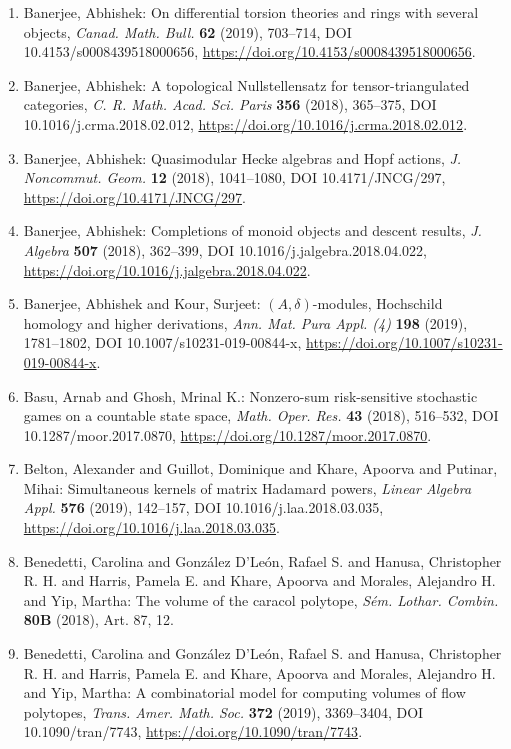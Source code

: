 \begin{enumerate}
\item Banerjee, Abhishek: On differential torsion theories and rings with several
objects, \emph{Canad. Math. Bull.} {\bf 62} (2019), 703--714, DOI 10.4153/s0008439518000656, \url{https://doi.org/10.4153/s0008439518000656}.
\item Banerjee, Abhishek: A topological {N}ullstellensatz for tensor-triangulated
categories, \emph{C. R. Math. Acad. Sci. Paris} {\bf 356} (2018), 365--375, DOI 10.1016/j.crma.2018.02.012, \url{https://doi.org/10.1016/j.crma.2018.02.012}.
\item Banerjee, Abhishek: Quasimodular {H}ecke algebras and {H}opf actions, \emph{J. Noncommut. Geom.} {\bf 12} (2018), 1041--1080, DOI 10.4171/JNCG/297, \url{https://doi.org/10.4171/JNCG/297}.
\item Banerjee, Abhishek: Completions of monoid objects and descent results, \emph{J. Algebra} {\bf 507} (2018), 362--399, DOI 10.1016/j.jalgebra.2018.04.022, \url{https://doi.org/10.1016/j.jalgebra.2018.04.022}.
\item Banerjee, Abhishek and Kour, Surjeet: {$(A,\delta)$}-modules, {H}ochschild homology and higher
derivations, \emph{Ann. Mat. Pura Appl. (4)} {\bf 198} (2019), 1781--1802, DOI 10.1007/s10231-019-00844-x, \url{https://doi.org/10.1007/s10231-019-00844-x}.
\item Basu, Arnab and Ghosh, Mrinal K.: Nonzero-sum risk-sensitive stochastic games on a countable
state space, \emph{Math. Oper. Res.} {\bf 43} (2018), 516--532, DOI 10.1287/moor.2017.0870, \url{https://doi.org/10.1287/moor.2017.0870}.
\item Belton, Alexander and Guillot, Dominique and Khare, Apoorva
and Putinar, Mihai: Simultaneous kernels of matrix {H}adamard powers, \emph{Linear Algebra Appl.} {\bf 576} (2019), 142--157, DOI 10.1016/j.laa.2018.03.035, \url{https://doi.org/10.1016/j.laa.2018.03.035}.
\item Benedetti, Carolina and Gonz\'{a}lez D'Le\'{o}n, Rafael S. and Hanusa,
Christopher R. H. and Harris, Pamela E. and Khare, Apoorva and
Morales, Alejandro H. and Yip, Martha: The volume of the caracol polytope, \emph{S\'{e}m. Lothar. Combin.} {\bf 80B} (2018), Art. 87, 12.
\item Benedetti, Carolina and Gonz\'{a}lez D'Le\'{o}n, Rafael S. and Hanusa,
Christopher R. H. and Harris, Pamela E. and Khare, Apoorva and
Morales, Alejandro H. and Yip, Martha: A combinatorial model for computing volumes of flow polytopes, \emph{Trans. Amer. Math. Soc.} {\bf 372} (2019), 3369--3404, DOI 10.1090/tran/7743, \url{https://doi.org/10.1090/tran/7743}.

\end{enumerate}
